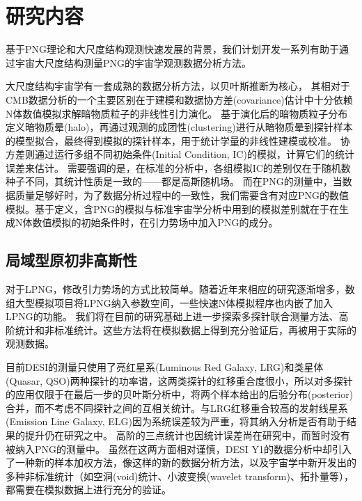 

\chapter{研究内容}
基于PNG理论和大尺度结构观测快速发展的背景，我们计划开发一系列有助于通过宇宙大尺度结构测量PNG的宇宙学观测数据分析方法。

大尺度结构宇宙学有一套成熟的数据分析方法，以贝叶斯推断为核心，%
其相对于CMB数据分析的一个主要区别在于建模和数据协方差(covariance)估计中十分依赖N体数值模拟求解暗物质粒子的非线性引力演化。
基于演化后的暗物质粒子分布定义暗物质晕(halo)，再通过观测的成团性(clustering)进行从暗物质晕到探针样本的模型拟合，最终得到模拟的探针样本，用于统计学量的非线性建模或校准。
协方差则通过运行多组不同初始条件(Initial Condition, IC)的模拟，计算它们的统计误差来估计。
需要强调的是，在标准的分析中，各组模拟IC的差别仅在于随机数种子不同，其统计性质是一致的——都是高斯随机场。
而在PNG的测量中，当数据质量足够好时，为了数据分析过程中的一致性，我们需要含有对应PNG的数值模拟。基于定义，含PNG的模拟与标准宇宙学分析中用到的模拟差别就在于在生成N体数值模拟的初始条件时，在引力势场中加入PNG的成分。

\section{局域型原初非高斯性}

对于LPNG，修改引力势场的方式比较简单。随着近年来相应的研究逐渐增多，数组大型模拟项目将LPNG纳入参数空间\cite{coulton2022quijotepng,adame2024unitpng,hadzhiyska2024abacuspng}，一些快速N体模拟程序也内嵌了加入LPNG的功能\cite{feng2016fastpm,enriquez2022picola}。
我们将在目前的研究基础上进一步探索多探针联合测量方法、高阶统计和非标准统计。这些方法将在模拟数据上得到充分验证后，再被用于实际的观测数据。

目前DESI的测量\cite{chaussidon2024desipng}只使用了亮红星系(Luminous Red Galaxy, LRG)和类星体(Quasar, QSO)两种探针的功率谱，这两类探针的红移重合度很小，所以对多探针的应用仅限于在最后一步的贝叶斯分析中，将两个样本给出的后验分布(posterior)合并，而不考虑不同探针之间的互相关统计。与LRG红移重合较高的发射线星系(Emission Line Galaxy, ELG)因为系统误差较为严重，将其纳入分析是否有助于结果的提升仍在研究之中。
高阶的三点统计也因统计误差尚在研究中，而暂时没有被纳入PNG的测量中。
虽然在这两方面相对谨慎，DESI Y1的数据分析中却引入了一种新的样本加权方法，像这样的新的数据分析方法，以及宇宙学中新开发出的多种非标准统计（如空洞(void)统计、小波变换(wavelet transform)、拓扑量等），都需要在模拟数据上进行充分的验证。

